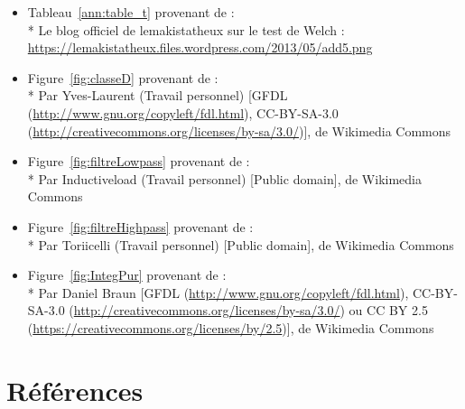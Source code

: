 \documentclass[10pt, oneside, a4paper]{article}
\begin{document}
\begin{itemize}
\item Tableau~\ref{ann:table_t} provenant de :\\*
Le blog officiel de lemakistatheux sur le test de Welch :
\url{https://lemakistatheux.files.wordpress.com/2013/05/add5.png}

\item Figure~\ref{fig:classeD} provenant de :\\*
Par Yves-Laurent (Travail personnel) [GFDL (\url{http://www.gnu.org/copyleft/fdl.html}),
CC-BY-SA-3.0 (\url{http://creativecommons.org/licenses/by-sa/3.0/})], de Wikimedia Commons

\item Figure~\ref{fig:filtreLowpass} provenant de :\\*
Par Inductiveload (Travail personnel) [Public domain], de Wikimedia Commons

\item Figure~\ref{fig:filtreHighpass} provenant de :\\*
Par Toriicelli (Travail personnel) [Public domain], de Wikimedia Commons

\item Figure~\ref{fig:IntegPur} provenant de :\\*
Par Daniel Braun [GFDL (\url{http://www.gnu.org/copyleft/fdl.html}),
CC-BY-SA-3.0 (\url{http://creativecommons.org/licenses/by-sa/3.0/}) ou
CC BY 2.5 (\url{https://creativecommons.org/licenses/by/2.5})], de Wikimedia Commons
\end{itemize}

\section*{Références}
\end{document}
